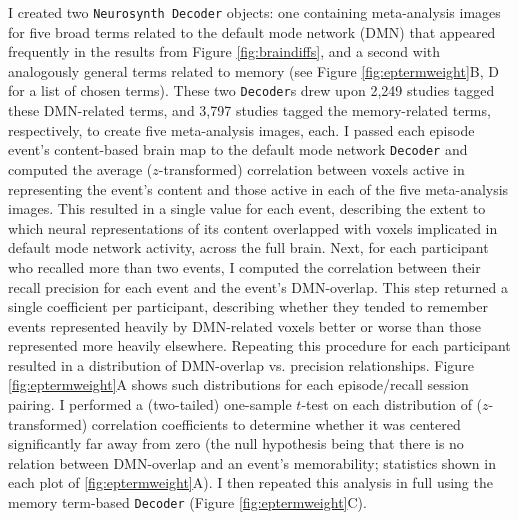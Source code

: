\documentclass{article}
\begin{document}
I created two \texttt{Neurosynth Decoder} objects: one containing meta-analysis images for five broad terms related to the default mode network (DMN) that appeared frequently in the results from Figure \ref{fig:braindiffs}, and a second with analogously general terms related to memory (see Figure \ref{fig:eptermweight}B, D for a list of chosen terms).  These two \texttt{Decoder}s drew upon 2,249 studies tagged these DMN-related terms, and 3,797 studies tagged the memory-related terms, respectively, to create five meta-analysis images, each.  I passed each episode event's content-based brain map to the default mode network \texttt{Decoder} and computed the average ($z$-transformed) correlation between voxels active in representing the event's content and those active in each of the five meta-analysis images.  This resulted in a single value for each event, describing the extent to which neural representations of its content overlapped with voxels implicated in default mode network activity, across the full brain.  Next, for each participant who recalled more than two events, I computed the correlation between their recall precision for each event and the event's DMN-overlap.  This step returned a single coefficient per participant, describing whether they tended to remember events represented heavily by DMN-related voxels better or worse than those represented more heavily elsewhere.  Repeating this procedure for each participant resulted in a distribution of DMN-overlap vs. precision relationships.  Figure \ref{fig:eptermweight}A shows such distributions for each episode/recall session pairing.  I performed a (two-tailed) one-sample $t$-test on each distribution of ($z$-transformed) correlation coefficients to determine whether it was centered significantly far away from zero (the null hypothesis being that there is no relation between DMN-overlap and an event's memorability; statistics shown in each plot of \ref{fig:eptermweight}A).  I then repeated this analysis in full using the memory term-based \texttt{Decoder} (Figure \ref{fig:eptermweight}C). 

\end{document}
